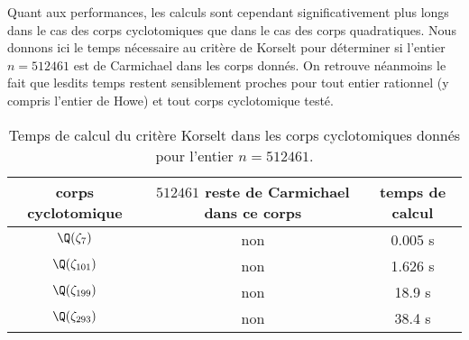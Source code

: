 Quant aux performances, les calculs sont cependant significativement plus longs dans le cas des corps cyclotomiques que dans le cas des corps quadratiques. Nous donnons ici le temps nécessaire au critère de Korselt pour déterminer si l'entier $n = 512461$ est de Carmichael dans les corps donnés. On retrouve néanmoins le fait que lesdits temps restent sensiblement proches pour tout entier rationnel (y compris l'entier de Howe) et tout corps cyclotomique testé. 

\begin{table}[H]
	\begin{center}
		\begin{tabular}{|c|c|c|}
			\hline
			corps cyclotomique & $512461$ reste de Carmichael dans ce corps & temps de calcul \\
			\hline
			\hline
			$\Q(\zeta_7)$ & non &0.005 s \\\hline
			$\Q(\zeta_{101})$ & non & 1.626 s \\\hline
			$\Q(\zeta_{199})$ & non & 18.9 s \\\hline
			$\Q(\zeta_{293})$ & non & 38.4 s \\\hline
		\end{tabular}
		\caption{Temps de calcul du critère Korselt dans les corps cyclotomiques donnés pour l'entier $n=512461$.}
	\end{center}
\end{table}

